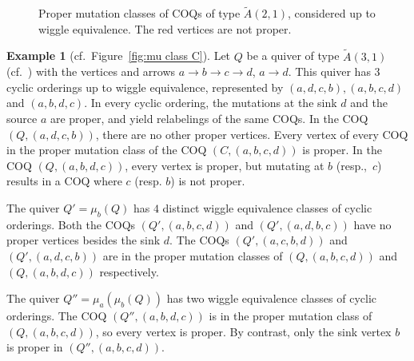 \documentclass[11pt, letterpaper]{amsart}
\theoremstyle{definition}
\newtheorem{example}[theorem]{Example}
\numberwithin{equation}{section}
\begin{document}
\begin{figure}[ht]
{
}
\vspace{10pt}
\caption{Proper mutation classes of COQs of type $\tilde A(2,1)$, considered up to wiggle equivalence. 
The red vertices are not proper.}
\label{fig:proper mu classes of A(2,1)}
\end{figure}

\vspace{-10pt}

\begin{example}[cf.\ Figure~\ref{fig:mu class C}]
\label{eg:acyclic 4 cycle}
Let $Q$ be a quiver of type $\tilde A(3,1)$ (cf.\ \cite[Figure~16]{cats1})
with the vertices and arrows $a \rightarrow b \rightarrow c \rightarrow d$, $a \rightarrow d$. %
This quiver has $3$ cyclic orderings up to wiggle equivalence, 
represented by $(a,d,c, b), (a,b,c,d)$  and $(a,b,d,c)$.  
In every cyclic ordering, the mutations at the sink $d$ and the source $a$ are proper, and yield relabelings of the same COQs.
In the COQ $(Q, (a,d,c,b))$, there are no other proper vertices.
Every vertex of every COQ in the proper mutation class of the COQ $(C, (a,b,c,d))$ is proper.
In the COQ $(Q, (a,b,d,c))$, every vertex is proper, but mutating at $b$ (resp.,~$c$) results in a COQ where $c$ (resp. $b$) is not proper.


The quiver $Q'=\mu_b(Q)$ has $4$ distinct wiggle equivalence classes of cyclic orderings.
Both the COQs $(Q', (a, b,c,d))$ and $(Q', (a,d,b, c))$ have no proper vertices besides the sink $d$.
The COQs $(Q',(a,c,b,d))$ and $(Q',(a, d, c, b))$ are in the proper mutation classes of  $(Q, (a,b,c,d))$ and $(Q, (a,b,d,c))$ respectively.

The quiver $Q''=\mu_a (\mu_b(Q))$ has two wiggle equivalence classes of cyclic orderings.
The COQ $(Q'', (a,b, d,c))$ is in the proper mutation class of$(Q, (a,b,c,d))$, so every vertex is proper.
By contrast, only the sink vertex $b$ is proper in $(Q'', (a,b,c,d))$.
\end{example}
\end{document}
